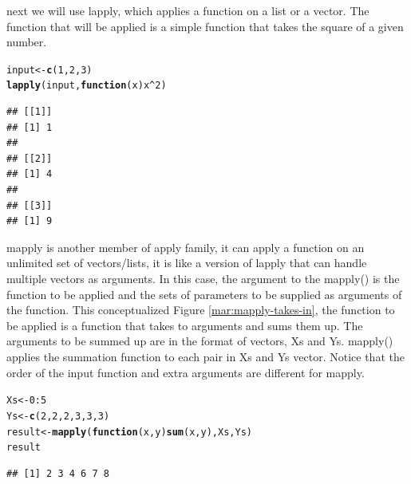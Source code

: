 \documentclass[english,nohyper]{tufte-book}\usepackage[]{graphicx}\usepackage[]{color}
\makeatletter
\newcommand{\hlnum}[1]{\textcolor[rgb]{0.686,0.059,0.569}{#1}}%
\newcommand{\hlopt}[1]{\textcolor[rgb]{0,0,0}{#1}}%
\newcommand{\hlstd}[1]{\textcolor[rgb]{0.345,0.345,0.345}{#1}}%
\newcommand{\hlkwa}[1]{\textcolor[rgb]{0.161,0.373,0.58}{\textbf{#1}}}%
\newcommand{\hlkwb}[1]{\textcolor[rgb]{0.69,0.353,0.396}{#1}}%
\newcommand{\hlkwc}[1]{\textcolor[rgb]{0.333,0.667,0.333}{#1}}%
\newcommand{\hlkwd}[1]{\textcolor[rgb]{0.737,0.353,0.396}{\textbf{#1}}}%
\newenvironment{kframe}{%
 \def\at@end@of@kframe{}%
 \ifinner\ifhmode%
  \def\at@end@of@kframe{\end{minipage}}%
  \begin{minipage}{\columnwidth}%
 \fi\fi%
 \def\FrameCommand##1{\hskip\@totalleftmargin \hskip-\fboxsep
 \colorbox{shadecolor}{##1}\hskip-\fboxsep
     \hskip-\linewidth \hskip-\@totalleftmargin \hskip\columnwidth}%
 \MakeFramed {\advance\hsize-\width
   \@totalleftmargin\z@ \linewidth\hsize
   \@setminipage}}%
 {\par\unskip\endMakeFramed%
 \at@end@of@kframe}
\newenvironment{knitrout}{}{} %
\makeatother
\begin{document}
next we will use lapply, which applies a function on a list or a vector.
The function that will be applied is a simple function that takes
the square of a given number.

\begin{knitrout}
\color{fgcolor}\begin{kframe}
\begin{alltt}
\hlstd{input} \hlkwb{<-} \hlkwd{c}\hlstd{(}\hlnum{1}\hlstd{,} \hlnum{2}\hlstd{,} \hlnum{3}\hlstd{)}
\hlkwd{lapply}\hlstd{(input,} \hlkwa{function}\hlstd{(}\hlkwc{x}\hlstd{) x}\hlopt{^}\hlnum{2}\hlstd{)}
\end{alltt}
\begin{verbatim}
## [[1]]
## [1] 1
## 
## [[2]]
## [1] 4
## 
## [[3]]
## [1] 9
\end{verbatim}
\end{kframe}
\end{knitrout}


mapply is another member of apply family, it can apply a function
on an unlimited set of vectors/lists, it is like a version of lapply
that can handle multiple vectors as arguments. In this case, the argument
to the mapply() is the function to be applied and the sets of parameters
to be supplied as arguments of the function. This conceptualized Figure
\ref{mar:mapply-takes-in}, the function to be applied is a function
that takes to arguments and sums them up. The arguments to be summed
up are in the format of vectors, Xs and Ys. mapply() applies the summation
function to each pair in Xs and Ys vector. Notice that the order of
the input function and extra arguments are different for mapply.

\begin{knitrout}
\color{fgcolor}\begin{kframe}
\begin{alltt}
\hlstd{Xs} \hlkwb{<-} \hlnum{0}\hlopt{:}\hlnum{5}
\hlstd{Ys} \hlkwb{<-} \hlkwd{c}\hlstd{(}\hlnum{2}\hlstd{,} \hlnum{2}\hlstd{,} \hlnum{2}\hlstd{,} \hlnum{3}\hlstd{,} \hlnum{3}\hlstd{,} \hlnum{3}\hlstd{)}
\hlstd{result} \hlkwb{<-} \hlkwd{mapply}\hlstd{(}\hlkwa{function}\hlstd{(}\hlkwc{x}\hlstd{,} \hlkwc{y}\hlstd{)} \hlkwd{sum}\hlstd{(x, y), Xs, Ys)}
\hlstd{result}
\end{alltt}
\begin{verbatim}
## [1] 2 3 4 6 7 8
\end{verbatim}
\end{kframe}
\end{knitrout}
\end{document}
